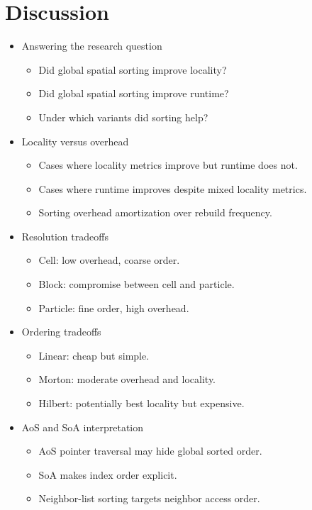 \chapter{Discussion}
\label{ch:discussion}

\begin{itemize}
    \item Answering the research question
    \begin{itemize}
        \item Did global spatial sorting improve locality?
        \item Did global spatial sorting improve runtime?
        \item Under which variants did sorting help?
    \end{itemize}

    \item Locality versus overhead
    \begin{itemize}
        \item Cases where locality metrics improve but runtime does not.
        \item Cases where runtime improves despite mixed locality metrics.
        \item Sorting overhead amortization over rebuild frequency.
    \end{itemize}

    \item Resolution tradeoffs
    \begin{itemize}
        \item Cell: low overhead, coarse order.
        \item Block: compromise between cell and particle.
        \item Particle: fine order, high overhead.
    \end{itemize}

    \item Ordering tradeoffs
    \begin{itemize}
        \item Linear: cheap but simple.
        \item Morton: moderate overhead and locality.
        \item Hilbert: potentially best locality but expensive.
    \end{itemize}

    \item AoS and SoA interpretation
    \begin{itemize}
        \item AoS pointer traversal may hide global sorted order.
        \item SoA makes index order explicit.
        \item Neighbor-list sorting targets neighbor access order.
    \end{itemize}


\end{itemize}
